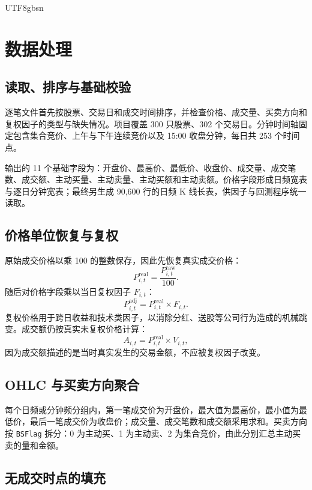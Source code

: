 \documentclass[a4paper,11pt,openany]{report}
\newcommand{\code}[1]{\texttt{#1}}
\begin{document}
\begin{CJK*}{UTF8}{gbsn}
\chapter{数据处理}

\section{读取、排序与基础校验}

逐笔文件首先按股票、交易日和成交时间排序，并检查价格、成交量、买卖方向和复权因子的类型与缺失情况。项目覆盖 300 只股票、302 个交易日。分钟时间轴固定包含集合竞价、上午与下午连续竞价以及 15:00 收盘分钟，每日共 253 个时间点。

输出的 11 个基础字段为：开盘价、最高价、最低价、收盘价、成交量、成交笔数、成交额、主动买量、主动卖量、主动买额和主动卖额。价格字段形成日频宽表与逐日分钟宽表；最终另生成 90,600 行的日频 K 线长表，供因子与回测程序统一读取。

\section{价格单位恢复与复权}

原始成交价格以乘 100 的整数保存，因此先恢复真实成交价格：
\begin{equation}
P^{\mathrm{real}}_{i,t}=\frac{P^{\mathrm{raw}}_{i,t}}{100}.
\end{equation}
随后对价格字段乘以当日复权因子 $F_{i,t}$：
\begin{equation}
P^{\mathrm{adj}}_{i,t}=P^{\mathrm{real}}_{i,t}\times F_{i,t}.
\end{equation}
复权价格用于跨日收益和技术类因子，以消除分红、送股等公司行为造成的机械跳变。成交额仍按真实未复权价格计算：
\begin{equation}
A_{i,t}=P^{\mathrm{real}}_{i,t}\times V_{i,t},
\end{equation}
因为成交额描述的是当时真实发生的交易金额，不应被复权因子改变。

\section{OHLC 与买卖方向聚合}

每个日频或分钟频分组内，第一笔成交价为开盘价，最大值为最高价，最小值为最低价，最后一笔成交价为收盘价；成交量、成交笔数和成交额采用求和。买卖方向按 \code{BSFlag} 拆分：0 为主动买、1 为主动卖、2 为集合竞价，由此分别汇总主动买卖的量和金额。

\section{无成交时点的填充}


\end{CJK*}
\end{document}
